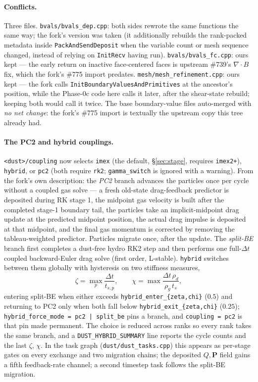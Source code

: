 \documentclass[11pt]{article}
\newcommand{\code}[1]{\texttt{#1}}
\newcommand{\file}[1]{\texttt{\small #1}}
\newcommand{\fn}[1]{\texttt{\small #1}}
\begin{document}
\paragraph{Conflicts.} Three files. \file{bvals/bvals\_dep.cpp}: both sides rewrote
the same functions the same way; the fork's version was taken (it additionally
rebuilds the rank-packed metadata inside \fn{PackAndSendDeposit} when the variable
count or mesh sequence changed, instead of relying on \fn{InitRecv} having run).
\file{bvals/bvals\_fc.cpp}: ours kept --- the early return on inactive face-centered
faces is upstream \#739's $\nabla\!\cdot\!B$ fix, which the fork's \#775 import predates.
\file{mesh/mesh\_refinement.cpp}: ours kept --- the fork calls
\fn{InitBoundaryValuesAndPrimitives} at the ancestor's position, while the Phase-0c
code here calls it later, after the shear-state rebuild; keeping both would call it
twice. The base boundary-value files auto-merged with \emph{no net change}: the
fork's \#775 import is textually the upstream copy this tree already had.

\paragraph{The PC2 and hybrid couplings.} \code{<dust>/coupling} now selects
\code{imex} (the default, \S\ref{sec:stage}, requires \code{imex2+}), \code{hybrid}, or
\code{pc2} (both require \code{rk2}; \code{gamma\_switch} is ignored with a warning).
From the fork's own description: the \emph{PC2} branch advances the particles once
per cycle without a coupled gas solve --- a fresh old-state drag-feedback predictor
is deposited during RK stage 1, the midpoint gas velocity is built after the completed
stage-1 boundary tail, the particles take an implicit-midpoint drag update at the
predicted midpoint position, the actual drag impulse is deposited at that midpoint,
and the final gas momentum is corrected by removing the tableau-weighted predictor.
Particles migrate once, after the update. The \emph{split-BE} branch first completes a
dust-free hydro RK2 step and then performs one full-$\Delta t$ coupled backward-Euler
drag solve (first order, L-stable). \code{hybrid} switches between them globally with
hysteresis on two stiffness measures,
\begin{equation}
  \zeta = \max_p \frac{\Delta t}{t_{s,p}}, \qquad
  \chi  = \max \frac{\Delta t\,\rho_d}{\rho_g\,t_s},
\end{equation}
entering split-BE when either exceeds \code{hybrid\_enter\_\{zeta,chi\}} ($0.5$) and
returning to PC2 only when both fall below \code{hybrid\_exit\_\{zeta,chi\}} ($0.25$);
\code{hybrid\_force\_mode = pc2 | split\_be} pins a branch, and \code{coupling = pc2}
is that pin made permanent. The choice is reduced across ranks so every rank takes the
same branch, and a \code{DUST\_HYBRID\_SUMMARY} line reports the cycle counts and the
last $\zeta$, $\chi$. In the task graph (\file{dust/dust\_tasks.cpp}) this appears as
per-stage gates on every exchange and two migration chains; the deposited $Q,\mathbf P$
field gains a fifth feedback-rate channel; a second timestep task follows the split-BE
migration.
\end{document}
